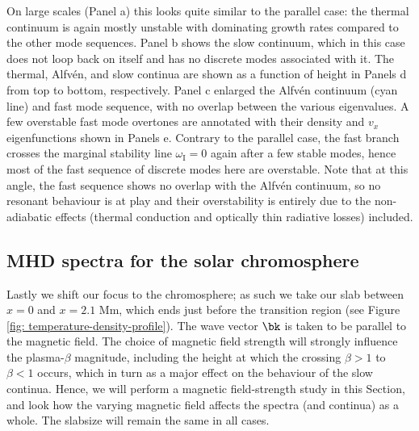On large scales (Panel a) this looks quite similar to the parallel case: the thermal continuum is again mostly unstable with dominating growth rates compared to the other mode sequences. Panel b shows the slow continuum, which in this case does not loop back on itself and has no discrete modes associated with it. The thermal, Alfv\'en, and slow continua are shown as a function of height in Panels d from top to bottom, respectively. Panel c enlarged the Alfv\'en continuum (cyan line) and fast mode sequence, with no overlap between the various eigenvalues. A few overstable fast mode overtones are annotated with their density and $v_x$ eigenfunctions shown in Panels e. Contrary to the parallel case, the fast branch crosses the marginal stability line $\omega_\text{I} = 0$ again after a few stable modes, hence most of the fast sequence of discrete modes here are overstable. Note that at this angle, the fast sequence shows no overlap with the Alfv\'en continuum, so no resonant behaviour is at play and their overstability is entirely due to the non-adiabatic effects (thermal conduction and optically thin radiative losses) included.


\subsection{MHD spectra for the solar chromosphere} \label{ss: chromosphere_spectra}
Lastly we shift our focus to the chromosphere; as such we take our slab between $x = 0$ and $x = 2.1$ Mm, which ends just before the transition region (see Figure \ref{fig: temperature-density-profile}). The wave vector $\bk$ is taken to be parallel to the magnetic field. The choice of magnetic field strength will strongly influence the plasma-$\beta$ magnitude, including the height at which the crossing $\beta > 1$ to $\beta < 1$ occurs, which in turn as a major effect on the behaviour of the slow continua. Hence, we will perform a magnetic field-strength study in this Section, and look how the varying magnetic field affects the spectra (and continua) as a whole. The slabsize will remain the same in all cases.

